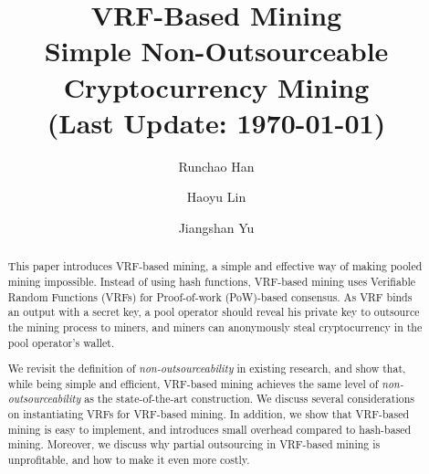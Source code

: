 \documentclass[runningheads]{llncs}
\begin{document}
\title{
  VRF-Based Mining\\
  \large Simple Non-Outsourceable Cryptocurrency Mining\\
  \vspace*{5pt} \large  (Last Update: \today{})
}


\author{%
Runchao Han  \and 
Haoyu Lin \and
Jiangshan Yu
}%

\maketitle

\begin{abstract}
  This paper introduces VRF-based mining, a simple and effective way of making pooled mining impossible.
  Instead of using hash functions, VRF-based mining uses Verifiable Random Functions (VRFs) for Proof-of-work (PoW)-based consensus.
  As VRF binds an output with a secret key, a pool operator should reveal his private key to outsource the mining process to miners, and miners can anonymously steal cryptocurrency in the pool operator's wallet.
  
  We revisit the definition of \emph{non-outsourceability} in existing research, and show that, while being simple and efficient, VRF-based mining achieves the same level of \emph{non-outsourceability} as the state-of-the-art construction.
  We discuss several considerations on instantiating VRFs for VRF-based mining.
  In addition, we show that VRF-based mining is easy to implement, and introduces small overhead compared to hash-based mining.
  Moreover, we discuss why partial outsourcing in VRF-based mining is unprofitable, and how to make it even more costly.
\end{abstract}















\appendix

\end{document}
